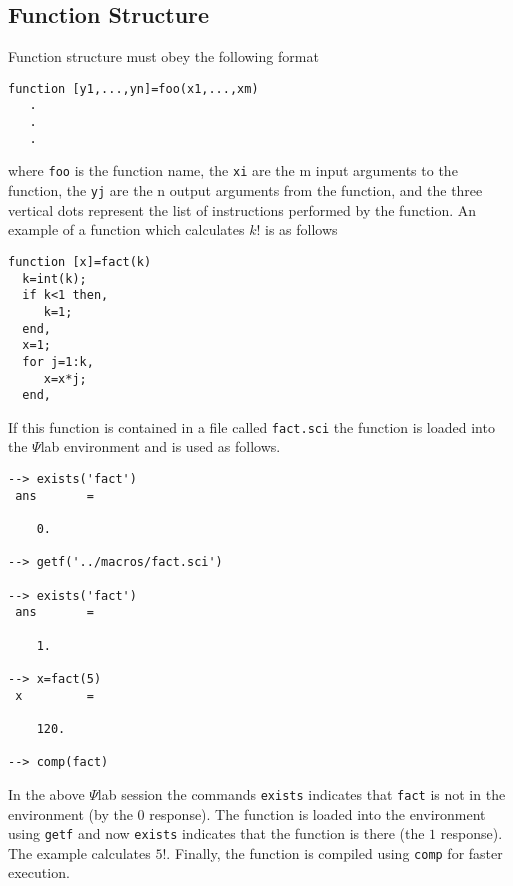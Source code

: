 \subsection{Function Structure}
Function structure must obey the following format
\begin{verbatim}
function [y1,...,yn]=foo(x1,...,xm)
   .
   .
   .
\end{verbatim}
where {\tt foo} is the function name, the {\tt xi} are the m input arguments
to the function,  the {\tt yj} are the n output arguments from the function, and
the three vertical dots represent the list of instructions performed by
the function.  An example of a function
which calculates $k!$ is as follows
\begin{verbatim}
function [x]=fact(k)
  k=int(k);
  if k<1 then, 
     k=1; 
  end,
  x=1;
  for j=1:k,
     x=x*j;
  end,
\end{verbatim}
If this function is contained in a file called {\tt fact.sci} the function
is loaded into the $\Psi$lab environment and is used as follows.
\begin{verbatim}
--> exists('fact')
 ans       =
 
    0.  
 
--> getf('../macros/fact.sci')
 
--> exists('fact')
 ans       =
 
    1.  
 
--> x=fact(5)
 x         =
 
    120.  
 
--> comp(fact)
\end{verbatim}
In the above $\Psi$lab session the commands 
{\tt exists} indicates that
{\tt fact} is not in the environment (by the $0$ response).  The
function is loaded into the environment using {\tt getf} and now {\tt exists}
indicates that the function is there (the $1$ response).  The example 
calculates $5!$. Finally, the function
is compiled using {\tt comp} for faster execution.

